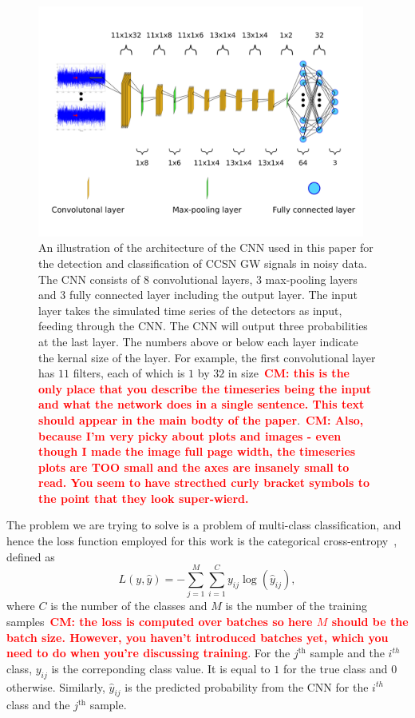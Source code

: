 \documentclass[aps,twocolumn,showpacs,groupedaddress, nofootinbib]{revtex4}  %
\newcommand{\cm}[1]{\textbf{\textcolor{red}{CM: #1}}}
\begin{document}
\begin{figure}
\includegraphics[width=0.96\textwidth]{CNN2.png}
\caption{An illustration of the architecture of the \ac{CNN} used in this paper
for the detection and classification of \ac{CCSN} \ac{GW} signals in noisy data. The
\ac{CNN} consists of $8$ convolutional layers, $3$ max-pooling layers and $3$
fully connected layer including the output layer.  The input layer takes the
simulated time series of the detectors as input, feeding through the \ac{CNN}.
The \ac{CNN} will output three probabilities at the last layer.  The numbers
above or below each layer indicate the kernal size of the layer. For example,
the first convolutional layer has $11$ filters, each of which is $1$ by $32$ in
size~\cm{this is the only place that you describe the timeseries being the
input and what the network does in a single sentence. This text should appear
in the main bodty of the paper}.~\cm{Also, because I'm very picky about plots
and images - even though I made the image full page width, the timeseries plots
are TOO small and the axes are insanely small to read. You seem to have
strecthed curly bracket symbols to the point that they look super-wierd.}
\label{fig:CNN}}
\end{figure}

%
%
The problem we are trying to solve is a problem of multi-class
classification, and hence the loss function employed for this work is the
categorical cross-entropy~\cite{abadi2016tensorflow}, defined as
%
\begin{equation}\label{eq:cce}
 L(y,\hat{y}) = -\sum^M_{j=1}\sum^C_{i=1}y_{ij}\log(\hat{y}_{ij}),
\end{equation}
%
where $C$ is the number of the classes and $M$ is the number of the training
samples~\cm{the loss is computed over batches so here $M$ should be the batch
size. However, you haven't introduced batches yet, which you need to do when
you're discussing training}. For the $j^{\text{th}}$ sample and the $i^{th}$
class, $y_{ij}$ is the correponding class value. It is equal to $1$ for the
true class and $0$ otherwise.  Similarly, $\hat{y}_{ij}$ is the predicted
probability from the \ac{CNN} for the $i^{th}$ class and the $j^{\text{th}}$
sample.
\end{document}
